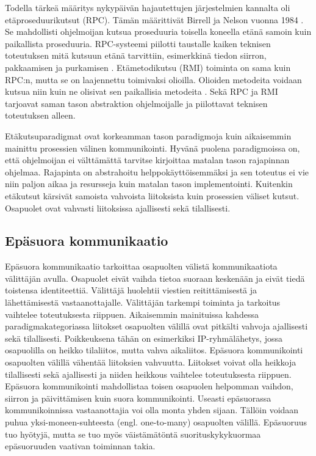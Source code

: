 Todella tärkeä määritys nykypäivän hajautettujen järjestelmien kannalta oli etäproseduurikutsut (RPC). Tämän määrittivät Birrell ja Nelson vuonna 1984 \cite{implemeting-remote-procedure-calls}. Se mahdollisti ohjelmoijan kutsua proseduuria toisella koneella etänä samoin kuin paikallista proseduuria. RPC-systeemi piilotti taustalle kaiken teknisen toteutuksen mitä kutsuun etänä tarvittiin, esimerkkinä tiedon siirron, pakkaamisen ja purkamisen \cite[s.~195--196]{distributed-systems-concepts-and-design}. Etämetodikutsu (RMI) toiminta on sama kuin RPC:n, mutta se on laajennettu toimivaksi olioilla. Olioiden metodeita voidaan kutsua niin kuin ne olisivat sen paikallisia metodeita \cite[s.~204]{distributed-systems-concepts-and-design}. Sekä RPC ja RMI tarjoavat saman tason abstraktion ohjelmoijalle ja piilottavat teknisen toteutuksen alleen.

Etäkutsuparadigmat ovat korkeamman tason paradigmoja kuin aikaisemmin mainittu prosessien välinen kommunikointi. Hyvänä puolena paradigmoissa on, että ohjelmoijan ei välttämättä tarvitse kirjoittaa matalan tason rajapinnan ohjelmaa. Rajapinta on abstrahoitu helppokäyttöisemmäksi ja sen toteutus ei vie niin paljon aikaa ja resursseja kuin matalan tason implementointi. Kuitenkin etäkutsut kärsivät samoista vahvoista liitoksista kuin prosessien väliset kutsut. Osapuolet ovat vahvasti liitoksissa ajallisesti sekä tilallisesti.


\subsection{Epäsuora kommunikaatio}
\label{ch:indirect-communication}
Epäsuora kommunikaatio tarkoittaa osapuolten välistä kommunikaatiota välittäjän avulla. Osapuolet eivät vaihda tietoa suoraan keskenään ja eivät tiedä toistensa identiteettiä. Välittäjä huolehtii viestien reitittämisestä ja lähettämisestä vastaanottajalle. Välittäjän tarkempi toiminta ja tarkoitus vaihtelee toteutuksesta riippuen. Aikaisemmin mainituissa kahdessa paradigmakategoriassa liitokset osapuolten välillä ovat pitkälti vahvoja ajallisesti sekä tilallisesti. Poikkeuksena tähän on esimerkiksi IP-ryhmälähetys, jossa osapuolilla on heikko tilaliitos, mutta vahva aikaliitos. Epäsuora kommunikointi osapuolten välillä vähentää liitoksien vahvuutta. Liitokset voivat olla heikkoja tilallisesti sekä ajallisesti ja niiden heikkous vaihtelee toteutuksesta riippuen. Epäsuora kommunikointi mahdollistaa toisen osapuolen helpomman vaihdon, siirron ja päivittämisen kuin suora kommunikointi. Useasti epäsuorassa kommunikoinnissa vastaanottajia voi olla monta yhden sijaan. Tällöin voidaan puhua yksi-moneen-suhteesta (engl. one-to-many) osapuolten välillä. Epäsuoruus tuo hyötyjä, mutta se tuo myös väistämätöntä suorituskykykuormaa epäsuoruuden vaativan toiminnan takia. \mbox{\cite[s.~230--231]{distributed-systems-concepts-and-design}}


